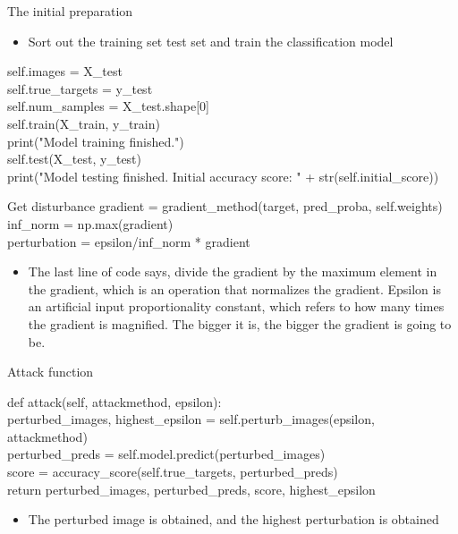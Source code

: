 \documentclass[
 size=14pt,
 paper=smartboard,  %
 mode=present, 		%
 display=slides, 	%
 style=tuliplab,  	%
 pauseslide,
 fleqn,leqno]{powerdot}
\begin{document}
\begin{slide}[toc=,bm=]{The initial preparation}
	\begin{itemize}
	\item Sort out the training set test set and train the classification model
	\end{itemize}
	self.images = X_test\\
        self.true_targets = y_test\\
        self.num_samples = X_test.shape[0]\\
        self.train(X_train, y_train)\\
        print("Model training finished.")\\
        self.test(X_test, y_test)\\
        print("Model testing finished. Initial accuracy score: " + str(self.initial_score))\\

\end{slide}

\begin{slide}{Get disturbance}
		gradient = gradient_method(target, pred_proba, self.weights)\\
inf_norm = np.max(gradient)\\
perturbation = epsilon/inf_norm * gradient\\

	\begin{itemize}
		\item The last line of code says, divide the gradient by the maximum element in the gradient, which is an operation that normalizes the gradient.
		Epsilon is an artificial input proportionality constant, which refers to how many times the gradient is magnified.
		The bigger it is, the bigger the gradient is going to be.
	\end{itemize}
	
	
\end{slide}

\begin{slide}{Attack function}
	
	def attack(self, attackmethod, epsilon):\\
        perturbed_images, highest_epsilon = self.perturb_images(epsilon, attackmethod)\\
        perturbed_preds = self.model.predict(perturbed_images)\\
        score = accuracy_score(self.true_targets, perturbed_preds)\\
        return perturbed_images, perturbed_preds, score, highest_epsilon\\
	\begin{itemize}
	\item 	The perturbed image is obtained, and the highest perturbation is obtained
	\end{itemize}
	
\end{slide}
\end{document}
